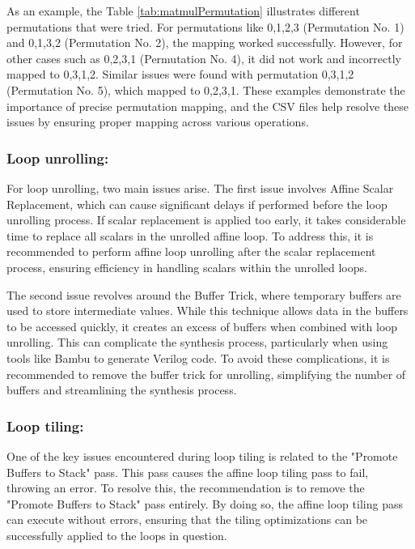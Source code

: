 As an example, the Table \ref{tab:matmulPermutation} illustrates different permutations that were tried. For permutations like 0,1,2,3 (Permutation No. 1) and 0,1,3,2 (Permutation No. 2), the mapping worked successfully. However, for other cases such as 0,2,3,1 (Permutation No. 4), it did not work and incorrectly mapped to 0,3,1,2. Similar issues were found with permutation 0,3,1,2 (Permutation No. 5), which mapped to 0,2,3,1. These examples demonstrate the importance of precise permutation mapping, and the CSV files help resolve these issues by ensuring proper mapping across various operations.

\subsubsection{Loop unrolling:}

For loop unrolling, two main issues arise. The first issue involves Affine Scalar Replacement, which can cause significant delays if performed before the loop unrolling process. If scalar replacement is applied too early, it takes considerable time to replace all scalars in the unrolled affine loop. To address this, it is recommended to perform affine loop unrolling after the scalar replacement process, ensuring efficiency in handling scalars within the unrolled loops.

The second issue revolves around the Buffer Trick, where temporary buffers are used to store intermediate values. While this technique allows data in the buffers to be accessed quickly, it creates an excess of buffers when combined with loop unrolling. This can complicate the synthesis process, particularly when using tools like Bambu to generate Verilog code. To avoid these complications, it is recommended to remove the buffer trick for unrolling, simplifying the number of buffers and streamlining the synthesis process.

\subsubsection{Loop tiling:}

One of the key issues encountered during loop tiling is related to the "Promote Buffers to Stack" pass. This pass causes the affine loop tiling pass to fail, throwing an error. To resolve this, the recommendation is to remove the "Promote Buffers to Stack" pass entirely. By doing so, the affine loop tiling pass can execute without errors, ensuring that the tiling optimizations can be successfully applied to the loops in question.

